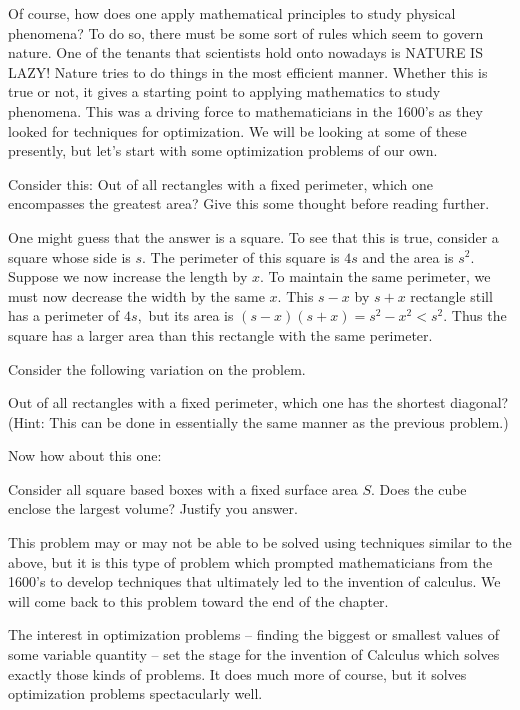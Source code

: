 Of course, how does one apply
mathematical principles to study physical phenomena?  To do so, there
must be some sort of rules which seem to govern nature.  One of the
tenants that scientists hold onto nowadays is NATURE IS LAZY!  Nature
tries to do things in the most efficient manner.  Whether this is true
or not, it gives a starting point to applying mathematics to study
phenomena.  This was a driving force to mathematicians in the 1600's
as they looked for techniques for optimization.  We will be looking at
some of these presently, but let's start with some optimization
problems of our own.
 
Consider this: Out of all rectangles with a fixed perimeter, which one
encompasses the greatest area? Give this some thought before reading
further.


One might guess that the answer is a square.  To see that this is
true, consider a square whose side is $s$.  The perimeter of this
square is $4s$ and the area is $s^2.$  Suppose we now increase the
length by $x.$  To maintain the same perimeter, we must now decrease
the width by the same $x.$  This $s-x$ by $s+x$ rectangle still has a
perimeter of $4s,$ but its area is $(s-x)(s+x)=s^2-x^2<s^2.$  Thus the
square has a larger area than this rectangle with the same perimeter. 


Consider the following variation on the problem.
 \begin{embeddedproblem}{}
   Out of all rectangles with a fixed perimeter, which one has the
   shortest diagonal? (Hint: This can be done in essentially the same
   manner as the previous problem.)
 \end{embeddedproblem}

Now how about this one:
\begin{embeddedproblem}{}
  Consider all square based boxes with a fixed surface area $S.$ Does
  the cube enclose the largest volume?  Justify you answer.
\end{embeddedproblem}

This problem may or may not be able to be solved using techniques
similar to the above, but it is this type of problem which prompted
mathematicians from the 1600's to develop techniques that ultimately
led to the invention of calculus.  We will come back to this problem
toward the end of the chapter.  
\endaptta{}

The interest in optimization problems -- finding the biggest or
smallest values of some variable quantity -- set the stage for the
invention of Calculus which solves exactly those kinds of problems. It
does much more of course, but it solves optimization problems
spectacularly well.

